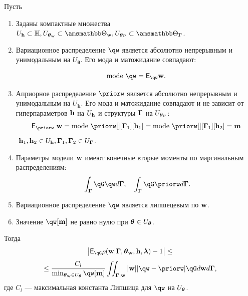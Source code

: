 \begin{lemma}
\label{lem:cp_bound}
Пусть
\begin{enumerate}

\item Заданы компактные множества $\Uh \subset \Hb, \Utetaw \subset \Tetawb, \UtetaG \subset \TetaGb$.

\item Вариационное распределение $\qw$  является абсолютно непрерывным и унимодальным на  $U_{\boldsymbol{\theta}}$.
Его мода и матожидание совпадают:

\[
  \text{mode}~\qw = \E_{\qw} \w.
\]




\item Априорное распределение $\priorw$ является абсолютно непрерывным и унимодальным на  $U_\mathbf{h}$. Его мода и матожидание совпадают и не зависит от гиперпараметров $\mathbf{h}$  на $U_{\mathbf{h}}$ и структуры $\boldsymbol{\Gamma}$ на $U_{\boldsymbol{\theta}_{\boldsymbol{\Gamma}}}$:
\[
\E_{\priorw}~\w = \text{mode}~\priorw[][\G_1][\h_1]=\text{mode}~\priorw[][\G_1][\h_2]=\mathbf{m}
\]
$~\mathbf{h}_1,\mathbf{h}_2 \in U_{\mathbf{h}}, \boldsymbol{\Gamma}_1,\boldsymbol{\Gamma}_2 \in U_{\boldsymbol{\Gamma}}$.


\item Параметры модели $\mathbf{w}$ имеют конечные вторые моменты по маргинальным распределениям:
\[
   \int_{\G}\qG\qw d\G, \quad \int_{\G}\qG\priorw d\G.
\]


\item Вариационное распределение $\qw$ является липшецевым по $\mathbf{w}$.

\item Значение $\qw[\mathbf{m}]$ не равно нулю при $\boldsymbol{\theta} \in U_{\boldsymbol{\theta}}$.
\end{enumerate}
Тогда 
\[
   \left|\E_{\qG} {\rho}(\w|\G, \tetaw, \h, \lam) - 1\right| \leq
\]
\[
\leq \frac{C_l}{\min_{\tetaw \in \Uteta} \qw[\mathbf{m}]} \iint_{\G,\w} |\w| |\qw - \priorw|\qG d\w d\G,
\]
где $C_l$ --- максимальная константа Липшица для $\qw$ на $U_{\boldsymbol{\theta}}$.

\end{lemma}
